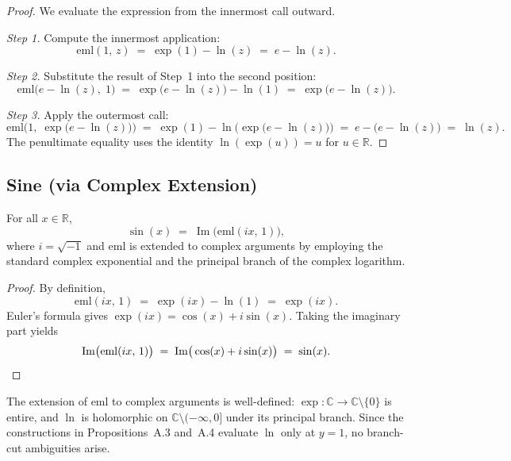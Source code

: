 \begin{proof}
We evaluate the expression from the innermost call outward.

\medskip
\noindent\textit{Step 1.}  Compute the innermost application:
\[
    \mathrm{eml}(1,\, z) \;=\; \exp(1) - \ln(z) \;=\; e - \ln(z).
\]

\noindent\textit{Step 2.}  Substitute the result of Step~1 into the second position:
\[
    \mathrm{eml}\!\big(e - \ln(z),\; 1\big)
    \;=\; \exp\!\big(e - \ln(z)\big) - \ln(1)
    \;=\; \exp\!\big(e - \ln(z)\big).
\]

\noindent\textit{Step 3.}  Apply the outermost call:
\[
    \mathrm{eml}\!\Big(1,\; \exp\!\big(e - \ln(z)\big)\Big)
    \;=\; \exp(1) - \ln\!\Big(\exp\!\big(e - \ln(z)\big)\Big)
    \;=\; e - \big(e - \ln(z)\big)
    \;=\; \ln(z).
\]
The penultimate equality uses the identity $\ln(\exp(u)) = u$ for $u \in \mathbb{R}$.
\end{proof}

\subsection{Sine (via Complex Extension)}
\label{sec:proof-sin}

\begin{proposition}
For all $x \in \mathbb{R}$,
\[
    \sin(x) \;=\; \operatorname{Im}\!\big(\mathrm{eml}(ix,\, 1)\big),
\]
where $i = \sqrt{-1}$ and $\mathrm{eml}$ is extended to complex arguments by employing the standard complex exponential and the principal branch of the complex logarithm.
\end{proposition}

\begin{proof}
By definition,
\[
    \mathrm{eml}(ix,\, 1)
    \;=\; \exp(ix) - \ln(1)
    \;=\; \exp(ix).
\]
Euler's formula gives $\exp(ix) = \cos(x) + i\sin(x)$.  Taking the imaginary part yields
\[
    \operatorname{Im}\!\big(\mathrm{eml}(ix,\, 1)\big)
    \;=\; \operatorname{Im}\!\big(\cos(x) + i\sin(x)\big)
    \;=\; \sin(x). \qedhere
\]
\end{proof}

\begin{remark}
The extension of $\mathrm{eml}$ to complex arguments is well-defined: $\exp\colon \mathbb{C} \to \mathbb{C}\setminus\{0\}$ is entire, and $\ln$ is holomorphic on $\mathbb{C}\setminus(-\infty, 0]$ under its principal branch.  Since the constructions in Propositions~A.3 and~A.4 evaluate $\ln$ only at $y=1$, no branch-cut ambiguities arise.
\end{remark}

